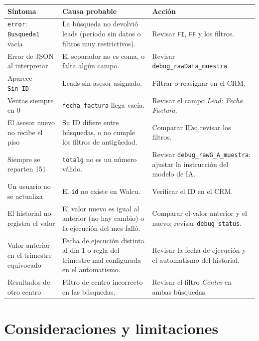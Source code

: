 \documentclass[11pt,a4paper]{article}
\newcommand{\code}[1]{\texttt{#1}}
\begin{document}
\begin{longtable}{@{}p{4.4cm}p{5cm}p{5.4cm}@{}}
\toprule
\textbf{Síntoma} & \textbf{Causa probable} & \textbf{Acción} \\
\midrule
\endhead
\code{error}: \code{Busqueda1} vacía & La búsqueda no devolvió leads (periodo sin datos o filtros muy restrictivos). & Revisar \code{FI}, \code{FF} y los filtros. \\
Error de JSON al interpretar & El separador no es coma, o falta algún campo. & Revisar \code{debug\_rawData\_muestra}. \\
Aparece \code{Sin\_ID} & Leads sin asesor asignado. & Filtrar o reasignar en el CRM. \\
Ventas siempre en 0 & \code{fecha\_factura} llega vacía. & Revisar el campo \emph{Lead: Fecha Factura}. \\
El asesor nuevo no recibe el piso & Su ID difiere entre búsquedas, o no cumple los filtros de antigüedad. & Comparar IDs; revisar los filtros. \\
Siempre se reparten 151 & \code{totalg} no es un número válido. & Revisar \code{debug\_rawG\_A\_muestra}; ajustar la instrucción del modelo de IA. \\
Un usuario no se actualiza & El \code{id} no existe en Walcu. & Verificar el ID en el CRM. \\
El historial no registra el valor & El valor nuevo es igual al anterior (no hay cambio) o la ejecución del mes falló. & Comparar el valor anterior y el nuevo; revisar \code{debug\_status}. \\
Valor anterior en el trimestre equivocado & Fecha de ejecución distinta al día 1 o regla del trimestre mal configurada en el automatismo. & Revisar la fecha de ejecución y el automatismo del historial. \\
Resultados de otro centro & Filtro de centro incorrecto en las búsquedas. & Revisar el filtro \emph{Centro} en ambas búsquedas. \\
\bottomrule
\end{longtable}

\section{Consideraciones y limitaciones}
\end{document}
